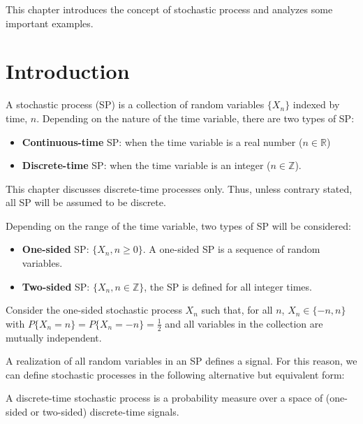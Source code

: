 
This chapter introduces the concept of stochastic process and analyzes some important examples.

\section{Introduction}

A stochastic process (SP) is a collection of random variables $\{X_n\}$ indexed by time, $n$. Depending on the nature of the time variable, there are two types of SP:
\begin{itemize}
\item \textbf{Continuous-time} SP: when the time variable is a real number ($n \in \mathbb{R}$)
\item \textbf{Discrete-time} SP: when the time variable is an integer ($n \in \mathbb{Z}$).
\end{itemize}

This chapter discusses discrete-time processes only. Thus, unless contrary stated, all SP will be assumed to be discrete.

Depending on the range of the time variable, two types of SP will be considered:
\begin{itemize}
\item \textbf{One-sided} SP: $\{X_n, n \ge 0\}$. A one-sided SP is a sequence of random variables.
\item \textbf{Two-sided} SP: $\{X_n, n\in \mathbb{Z}\}$, the SP is defined for all integer times.
\end{itemize}

\begin{example}

Consider the one-sided stochastic process $X_n$ such that, for all $n$, $X_n \in \{-n, n\}$ with $P\{X_n=n\}=P\{X_n=-n\}=\frac12$ and all variables in the collection are mutually independent.

\end{example}

A realization of all random variables in an SP defines a signal. For this reason, we can define stochastic processes in the following alternative but equivalent form:

\begin{definition}

A discrete-time stochastic process is a probability measure over a space of (one-sided or two-sided) discrete-time signals.

\end{definition}

